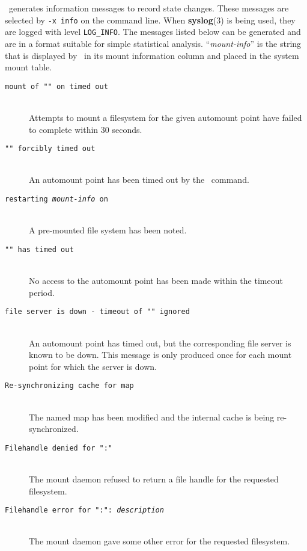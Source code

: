 \Amd\ generates information messages to record state changes.
These messages are selected by {\tt -x~info} on the command line.
When {\bf syslog}(3) is being used, they are logged with
level {\tt LOG\_INFO}.
The messages listed below can be generated
and are in a format suitable for simple statistical analysis.
``{\em mount-info}'' is the string that is displayed by \amq\ in its mount
information column and placed in the system mount table.
\begin{description}
\item[\tt mount of "" on  timed out]\mbox{}\\
Attempts to mount a filesystem for the given automount point have failed
to complete within 30 seconds.

\item[\tt "" forcibly timed out]\mbox{}\\
An automount point has been timed out by the \amq\ command.

\item[\tt restarting {\em mount-info} on ]\mbox{}\\
A pre-mounted file system has been noted.

\item[\tt "" has timed out]\mbox{}\\
No access to the automount point has been made within the timeout period.

\item[\tt file server  is down - timeout of "" ignored]\mbox{}\\
An automount point has timed out, but the corresponding file server is known to be down.
This message is only produced once for each mount point for which the server is down.

\item[\tt Re-synchronizing cache for map ]\mbox{}\\
The named map has been modified and the internal cache is being re-synchronized.

\item[\tt Filehandle denied for ":"]\mbox{}\\
The mount daemon refused to return a file handle for the requested filesystem.

\item[\tt Filehandle error for ":":\ {\em description}]\mbox{}\\
The mount daemon gave some other error for the requested filesystem.


\end{description}
